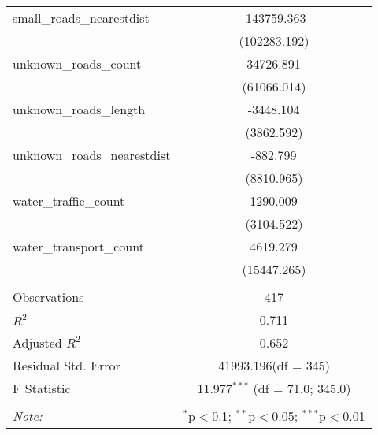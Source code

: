 \begin{table}[!htbp]
\begin{tabular}{@{\extracolsep{5pt}}lc}
 small_roads_nearestdist & -143759.363$^{}$ \\
  & (102283.192) \\
 unknown_roads_count & 34726.891$^{}$ \\
  & (61066.014) \\
 unknown_roads_length & -3448.104$^{}$ \\
  & (3862.592) \\
 unknown_roads_nearestdist & -882.799$^{}$ \\
  & (8810.965) \\
 water_traffic_count & 1290.009$^{}$ \\
  & (3104.522) \\
 water_transport_count & 4619.279$^{}$ \\
  & (15447.265) \\
\hline \\[-1.8ex]
 Observations & 417 \\
 $R^2$ & 0.711 \\
 Adjusted $R^2$ & 0.652 \\
 Residual Std. Error & 41993.196(df = 345)  \\
 F Statistic & 11.977$^{***}$ (df = 71.0; 345.0) \\
\hline
\hline \\[-1.8ex]
\textit{Note:} & \multicolumn{1}{r}{$^{*}$p$<$0.1; $^{**}$p$<$0.05; $^{***}$p$<$0.01} \\
\end{tabular}
\end{table}
